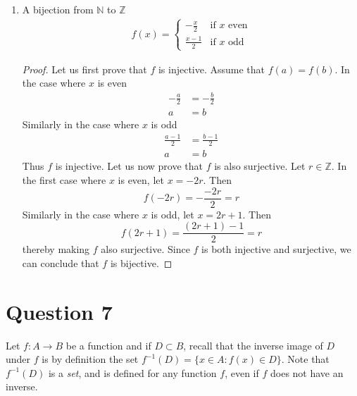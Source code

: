 \documentclass[11pt, oneside]{article}   	%
\newcommand{\N}{\mathbb N}
\newcommand{\Z}{\mathbb Z}
\begin{document}
\begin{enumerate}[\quad(a)]
	\item A bijection from $\N$ to $\Z$
	\begin{align*}
		f(x) = \begin{cases}
				-\frac{x}{2} & \text{if } x \text{ even} \\
				\frac{x-1}{2} & \text{if } x \text{ odd}
			\end{cases}
	\end{align*}
	\begin{proof}
	Let us first prove that $f$ is injective. Assume that $f(a) = f(b)$. In the case where $x$ is even
	\begin{align*}
		-\frac{a}{2} & = -\frac{b}{2} \\
		a& = b
	\end{align*}
	Similarly in the case where $x$ is odd
	\begin{align*}
		\frac{a-1}{2} & = \frac{b-1}{2} \\
		a& = b
	\end{align*}
	Thus $f$ is injective. Let us now prove that $f$ is also surjective. Let $r \in \Z$. In the first case where $x$ is even, let $x=-2r$. Then
	$$f(-2r)=-\frac{-2r}{2} = r$$
	Similarly in the case where $x$ is odd, let $x=2r+1$. Then
	$$f(2r+1) = \frac{(2r+1)-1}{2} = r$$
	thereby making $f$ also surjective. Since $f$ is both injective and surjective, we can conclude that $f$ is bijective.
	\end{proof}
\end{enumerate}



\section*{Question 7}

Let $f:A \to B$ be a function and if $D\subset B$, recall that the inverse image of $D$ under $f$ is by definition the set 
$f^{-1}(D)=\{x\in A:f(x)\in D\}$.  
Note that $f^{-1}(D)$  is a \emph{set}, and is defined for any function $f$, even if $f$ does not have an inverse.
\end{document}

